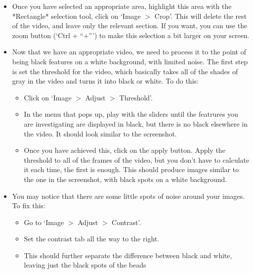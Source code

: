 \begin{itemize}
\item Once you have selected an appropriate area, highlight this area with the *Rectangle* selection tool, click on `Image $>$ Crop'. 
This will delete the rest of the video, and leave only the relevant section. 
If you want, you can use the zoom button (`Ctrl + ``+''') to make this selection a bit larger on your screen.
\item Now that we have an appropriate video, we need to process it to the point of being black features on a white background, with limited noise. 
The first step is set the threshold for the video, which basically takes all of the shades of gray in the video and turns it into black or white. 
To do this:
\begin{itemize}
\item Click on `Image $>$ Adjust $>$ Threshold'. 
\item In the menu that pops up, play with the sliders until the featrures you are investigating are displayed in black, but there is no black elsewhere in the video. 
It should look similar to the screenshot. 
\item Once you have achieved this, click on the apply button. 
Apply the threshold to all of the frames of the video, but you don't have to calculate it each time, the first is enough. This should produce images similar to the one in the screenshot, with black spots on a white background.
\end{itemize}
\item You may notice that there are some little spots of noise around your images. 
To fix this:
\begin{itemize}
\item Go to `Image $>$ Adjust $>$ Contrast'.
\item Set the contrast tab all the way to the right.
\item This should further separate the difference between black and white, leaving just the black spots of the beads
\end{itemize}
\end{itemize}
